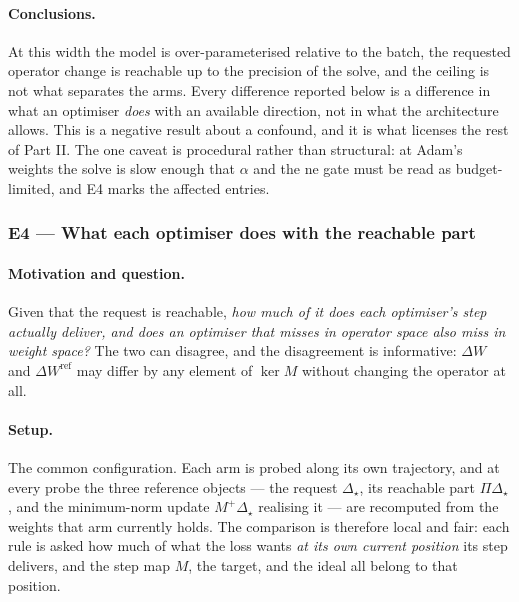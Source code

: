 \documentclass{article} %
\theoremstyle{plain}
\theoremstyle{definition}
\theoremstyle{remark}
\begin{document}
\paragraph{Conclusions.}
At this width the model is over-parameterised relative to the batch, the requested operator change
is reachable up to the precision of the solve, and the ceiling is not what separates the arms.
Every difference reported below is a difference in what an optimiser \emph{does} with an available
direction, not in what the architecture allows. This is a negative result about a confound, and it
is what licenses the rest of Part II. The one caveat is procedural rather than structural: at
Adam's weights the solve is slow enough that $\alpha$ and the $\mathrm{ne}$ gate must be read as
budget-limited, and E4 marks the affected entries.

\subsubsection{E4 --- What each optimiser does with the reachable part}
\label{sec:e4}

\paragraph{Motivation and question.}
Given that the request is reachable, \emph{how much of it does each optimiser's step actually
deliver, and does an optimiser that misses in operator space also miss in weight space?} The two
can disagree, and the disagreement is informative: $\Delta W$ and $\Delta W^{\mathrm{ref}}$ may
differ by any element of $\ker M$ without changing the operator at all.

\paragraph{Setup.}
The common configuration. Each arm is probed along its own trajectory, and at every probe the three
reference objects --- the request $\Delta_\star$, its reachable part $\Pi\Delta_\star$, and the
minimum-norm update $M^{+}\Delta_\star$ realising it --- are recomputed from the weights that arm
currently holds. The comparison is therefore local and fair: each rule is asked how much of what
the loss wants \emph{at its own current position} its step delivers, and the step map $M$, the
target, and the ideal all belong to that position.
\end{document}
